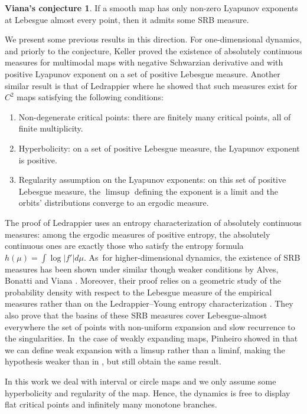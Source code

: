 \documentclass[10pt]{amsart}
\newenvironment{enumeratei}
{\bgroup\def\theenumi{\roman{enumi}}\def\theenumii{\arabic{enumii}}\begin{enumerate}}
{\end{enumerate}\egroup}
\let\rC C
\theoremstyle{definition}
\newtheorem*{conj*}{Viana's conjecture}
\begin{document}
\begin{conj*}
If a smooth map has only non-zero Lyapunov exponents at Lebesgue almost every point, then it admits some SRB measure.
\end{conj*}

We present some previous results in this direction. For one-dimensional dynamics, and priorly to the conjecture, Keller \cite{Keller_1990} proved the existence of absolutely continuous measures for multimodal maps with negative Schwarzian derivative and with positive Lyapunov exponent on a set of positive Lebesgue measure.
Another similar result is that of Ledrappier \cite{Ledrappier_1981} where he showed that such measures exist for $\rC^2$ maps satisfying the following conditions:
\begin{enumeratei}
\item
Non-degenerate critical points: there are finitely many critical points, all of finite multiplicity.
\item
Hyperbolicity: on a set of positive Lebesgue measure, the Lyapunov exponent is positive.
\item
Regularity assumption on the Lyapunov exponents: on this set of positive Lebesgue measure, the $\limsup$ defining the exponent is a limit and the orbits' distributions converge to an ergodic measure.
\end{enumeratei}

The proof of Ledrappier uses an entropy characterization of absolutely continuous measures: among the ergodic measures of positive entropy, the absolutely continuous ones are exactly those who satisfy the entropy formula $h(\mu) = \int \log |f'| d \mu$. As~for higher-dimensional dynamics, the existence of SRB measures has been shown under similar though weaker conditions by Alves, Bonatti and Viana \cite{Alves2000}.
Moreover, their proof relies on a geometric study of the probability density with respect to the Lebesgue measure of the empirical measures rather than on the Ledrappier--Young entropy characterization \cite{Ledrappier_Young_1985a,Ledrappier_Young_1985b}.
They also prove that the basins of these SRB measures cover Lebesgue-almost everywhere the set of points with non-uniform expansion and slow recurrence to the singularities. In~the case of weakly expanding maps, Pinheiro showed in \cite{Pinheiro_2006,Pinheiro2011} that we can define weak expansion with a limsup rather than a liminf, making the hypothesis weaker than in \cite{Alves2000}, but still obtain the same result.

In this work we deal with interval or circle maps and we only assume some hyperbolicity and regularity of the map.
Hence, the dynamics is free to display flat critical points and infinitely many monotone branches.
\end{document}
